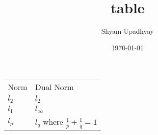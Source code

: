 \documentclass[11pt]{article}
\author{Shyam Upadhyay}
\date{\today}
\title{table}
\begin{document}
\maketitle
\tableofcontents

\begin{center}
\begin{tabular}{ll}
Norm & Dual Norm\\
$l_2$ & $l_2$\\
$l_1$ & $l_{\infty}$\\
$l_p$ & $l_q$ where $\frac{1}{p}+\frac{1}{q}=1$\\
\end{tabular}
\end{center}
\end{document}
